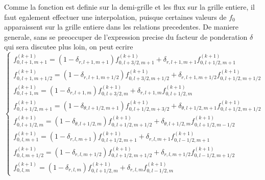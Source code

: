 Comme la fonction est definie sur la demi-grille et les flux sur la
grille entiere, il faut egalement effectuer une interpolation, puisque
certaines valeurs de $f_{0}$ apparaissent sur la grille entiere dans
les relations precedentes. De maniere generale, sans se preoccuper
de l'expression precise du facteur de ponderation $\delta$ qui sera
discutee plus loin, on peut ecrire \[
\left\{ \begin{array}{l}
f_{0,l+1,m+1}^{(k+1)}=\left(1-\delta_{r,l+1,m+1}\right)f_{0,l+3/2,m+1}^{(k+1)}+\delta_{r,l+1,m+1}f_{0,l+1/2,m+1}^{(k+1)}\\
f_{0,l+1,m+1/2}^{(k+1)}=\left(1-\delta_{r,l+1,m+1/2}\right)f_{0,l+3/2,m+1/2}^{(k+1)}+\delta_{r,l+1,m+1/2}f_{0,l+1/2,m+1/2}^{(k+1)}\\
f_{0,l+1,m}^{(k+1)}=\left(1-\delta_{r,l+1,m}\right)f_{0,l+3/2,m}^{(k+1)}+\delta_{r,l+1,m}f_{0,l+1/2,m}^{(k+1)}\\
f_{0,l+1/2,m+1}^{(k+1)}=\left(1-\delta_{\theta,l+1/2,m+1}\right)f_{0,l+1/2,m+3/2}^{(k+1)}+\delta_{\theta,l+1/2,m+1}f_{0,l+1/2,m+1/2}^{(k+1)}\\
f_{0,l+1/2,m}^{(k+1)}=\left(1-\delta_{\theta,l+1/2,m}\right)f_{0,l+1/2,m+1/2}^{(k+1)}+\delta_{\theta,l+1/2,m}f_{0,l+1/2,m-1/2}^{(k+1)}\\
f_{0,l,m+1}^{(k+1)}=\left(1-\delta_{r,l,m+1}\right)f_{0,l+1/2,m+1}^{(k+1)}+\delta_{r,l,m+1}f_{0,l-1/2,m+1}^{(k+1)}\\
f_{0,l,m+1/2}^{(k+1)}=\left(1-\delta_{r,l,m+1/2}\right)f_{0,l+1/2,m+1/2}^{(k+1)}+\delta_{r,l,m+1/2}f_{0,l-1/2,m+1/2}^{(k+1)}\\
f_{0,l,m}^{(k+1)}=\left(1-\delta_{r,l,m}\right)f_{0,l+1/2,m}^{(k+1)}+\delta_{r,l,m}f_{0,l-1/2,m}^{(k+1)}\end{array}\right.\]



